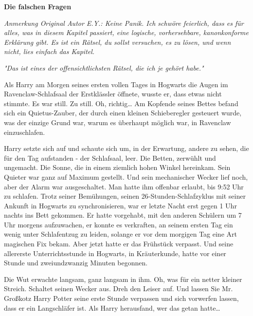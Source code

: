 

\hypertarget{die-falschen-fragen}{%

\textbf{Die falschen Fragen}

\emph{Anmerkung Original Autor E.Y.: Keine Panik. Ich schwöre feierlich, dass es für alles, was in diesem Kapitel passiert, eine logische, vorhersehbare, kanonkonforme Erklärung gibt. Es ist ein Rätsel, du sollst versuchen, es zu lösen, und wenn nicht, lies einfach das Kapitel.}

\emph{"Das ist eines der offensichtlichsten Rätsel, die ich je gehört habe."}

Als Harry am Morgen seines ersten vollen Tages in Hogwarts die Augen im Ravenclaw-Schlafsaal der Erstklässler öffnete, wusste er, dass etwas nicht stimmte. Es war still. Zu still. Oh, richtig… Am Kopfende seines Bettes befand sich ein Quietus-Zauber, der durch einen kleinen Schieberegler gesteuert wurde, was der einzige Grund war, warum es überhaupt möglich war, in Ravenclaw einzuschlafen.

Harry setzte sich auf und schaute sich um, in der Erwartung, andere zu sehen, die für den Tag aufstanden - der Schlafsaal, leer. Die Betten, zerwühlt und ungemacht. Die Sonne, die in einem ziemlich hohen Winkel hereinkam. Sein Quieter war ganz auf Maximum gestellt. Und sein mechanischer Wecker lief noch, aber der Alarm war ausgeschaltet. Man hatte ihm offenbar erlaubt, bis 9:52 Uhr zu schlafen. Trotz seiner Bemühungen, seinen 26-Stunden-Schlafzyklus mit seiner Ankunft in Hogwarts zu synchronisieren, war er letzte Nacht erst gegen 1 Uhr nachts ins Bett gekommen. Er hatte vorgehabt, mit den anderen Schülern um 7 Uhr morgens aufzuwachen, er konnte es verkraften, an seinem ersten Tag ein wenig unter Schlafentzug zu leiden, solange er vor dem morgigen Tag eine Art magischen Fix bekam. Aber jetzt hatte er das Frühstück verpasst. Und seine allererste Unterrichtsstunde in Hogwarts, in Kräuterkunde, hatte vor einer Stunde und zweiundzwanzig Minuten begonnen.

Die Wut erwachte langsam, ganz langsam in ihm. Oh, was für ein netter kleiner Streich. Schaltet seinen Wecker aus. Dreh den Leiser auf. Und lassen Sie Mr. Großkotz Harry Potter seine erste Stunde verpassen und sich vorwerfen lassen, dass er ein Langschläfer ist. Als Harry herausfand, wer das getan hatte…

}
